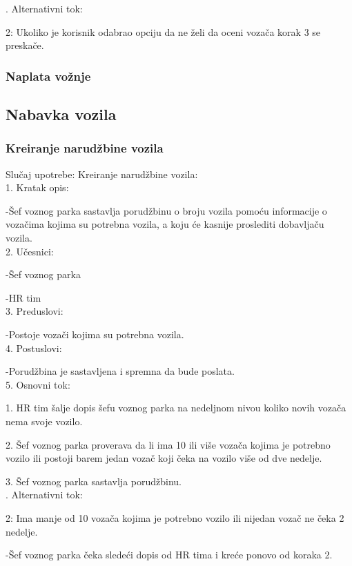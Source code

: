 . Alternativni tok:
\par 2: Ukoliko je korisnik odabrao opciju da ne želi da oceni vozača korak 3 se preskače.

\subsubsection{\bfseries Naplata vo\v znje}
\newpage

\subsection{\bfseries Nabavka vozila}

\subsubsection{\bfseries Kreiranje narudžbine vozila}
\noindent Slučaj upotrebe: Kreiranje narudžbine vozila:\\
1. Kratak opis:
\par -Šef voznog parka sastavlja porudžbinu o broju vozila pomoću informacije o vozačima kojima su potrebna vozila, a koju će kasnije proslediti dobavljaču vozila.\\
2. Učesnici:
\par -Šef voznog parka
\par -HR tim\\
3. Preduslovi:
\par -Postoje vozači kojima su potrebna vozila.\\
4. Postuslovi:
\par -Porudžbina je sastavljena i spremna da bude poslata.\\
5. Osnovni tok:
\par 1. HR tim šalje dopis šefu voznog parka na nedeljnom nivou koliko novih vozača nema svoje vozilo.
\par 2. Šef voznog parka proverava da li ima 10 ili više vozača kojima je potrebno vozilo ili postoji barem jedan vozač koji čeka na vozilo više od dve nedelje.
\par 3. Šef voznog parka sastavlja porudžbinu.\\

. Alternativni tok:
\par 2: Ima manje od 10 vozača kojima je potrebno vozilo ili nijedan vozač ne čeka 2 nedelje.
\par -Šef voznog parka čeka sledeći dopis od HR tima i kreće ponovo od koraka 2.

